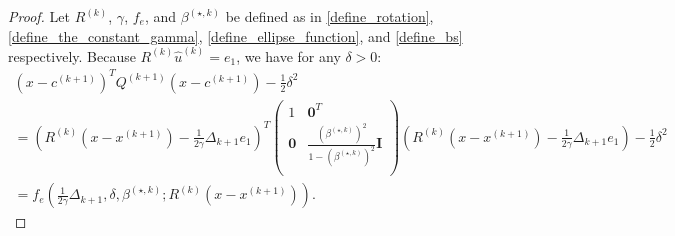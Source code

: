 \documentclass{article}
\theoremstyle{case}
\numberwithin{theorem}{subsection}
\newcommand{\bs}{{\beta^{(\star, k)}}}
\newcommand{\ck}{{c^{(k)}}}
\newcommand{\dk}{\Delta_k}
\newcommand{\dkpo}{\Delta_{k+1}}
\newcommand{\huk}{{{\hat u}^{(k)}}}
\newcommand{\qk}{{Q^{(k)}}}
\newcommand{\rotk}{{R^{(k)}}}
\newcommand{\sdk}{{\delta_k}}
\newcommand{\xkpo}{{{x}^{(k+1)}}}
\newcommand{\xk}{x^{(k)}}
\newcommand{\qkpo}{{Q^{(k+1)}}}
\newcommand{\ckpo}{{c^{(k+1)}}}
\begin{document}
\begin{proof}
Let $\rotk$, $\gamma$, $f_e$, and $\bs$ be defined as in \cref{define_rotation}, \cref{define_the_constant_gamma}, \cref{define_ellipse_function}, and \cref{define_bs} respectively.
Because $\rotk\huk = e_1$, we have for any $\delta > 0$:
\begin{align*}
\left(x - \ckpo\right)^T\qkpo\left(x - \ckpo\right) - \frac 1 2 \delta^2 \\
= \left(\rotk\left(x-\xkpo\right) - \frac 1 {2\gamma} \dkpo e_1\right)^T\begin{pmatrix}
1 & \boldsymbol0^T \\
\boldsymbol 0 & \frac{\left(\bs\right)^2}{1 - \left(\bs\right)^2} \boldsymbol I \\
\end{pmatrix} \left(\rotk\left(x-\xkpo\right) - \frac 1 {2\gamma} \dkpo e_1\right) - \frac 1 2 \delta^2 \\
= f_e\left(\frac 1 {2\gamma} \dkpo, \delta, \bs; \rotk\left(x - \xkpo\right)\right).
\end{align*}




\end{proof}
\end{document}
